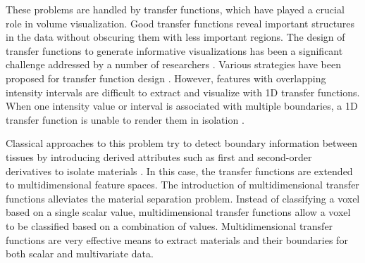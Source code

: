 \documentclass{egpubl}
\begin{document}
These problems are handled by transfer functions, which have played a crucial role in volume visualization.
Good transfer functions reveal important structures in the data without obscuring them with less important regions.
The design of transfer functions to generate informative visualizations has been a significant challenge addressed by a number of researchers \cite{pfister_transfer_2001}.
Various strategies have been proposed for transfer function design \cite{hadwiger_real-time_2006}.
However, features with overlapping intensity intervals are difficult to extract and visualize with 1D transfer functions.
When one intensity value or interval is associated with multiple boundaries, a 1D transfer function is unable to render them in isolation \cite{kniss_multidimensional_2002}.

Classical approaches to this problem try to detect boundary information between tissues by introducing derived attributes such as first and second-order derivatives to isolate materials \cite{kindlmann_semi-automatic_1998} \cite{kniss_multidimensional_2002}. In this case, the transfer functions are extended to multidimensional feature spaces. 
The introduction of multidimensional transfer functions alleviates the material separation problem.
Instead of classifying a voxel based on a single scalar value, multidimensional transfer functions allow a voxel to be classified based on a combination of values.
Multidimensional transfer functions are very effective means to extract materials and their boundaries for both scalar and multivariate data.
\end{document}
